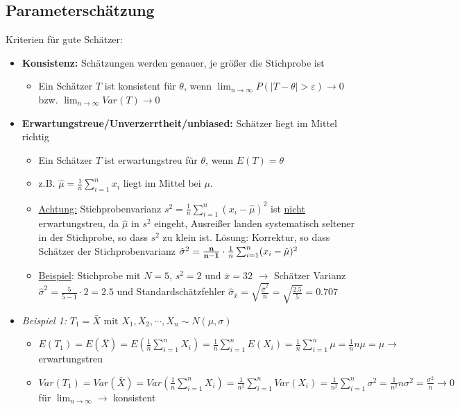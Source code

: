 \subsection{Parameterschätzung}

Kriterien für gute Schätzer:
\begin{itemize}
    \item \textbf{Konsistenz:} Schätzungen werden genauer, je größer die Stichprobe ist
    \begin{itemize}
        \item Ein Schätzer \(T\) ist konsistent für \(\theta\), wenn \(\lim_{n\rightarrow\infty}P(|T-\theta|>\varepsilon)\rightarrow 0\) bzw. \(\lim_{n\rightarrow\infty}Var(T)\rightarrow 0\)
    \end{itemize}
    \item \textbf{Erwartungstreue/Unverzerrtheit/unbiased:} Schätzer liegt im Mittel richtig
    \begin{itemize}
        \item Ein Schätzer \(T\) ist erwartungstreu für \(\theta\), wenn \(E(T)=\theta\)
        \item z.B. \(\hat{\mu}=\frac{1}{n}\sum_{i=1}^{n}x_i\) liegt im Mittel bei \(\mu\). 
        \item \underline{Achtung:} Stichprobenvarianz \(s^2=\frac{1}{n}\sum_{i=1}^{n}(x_i-\hat{\mu})^2\) ist \underline{nicht} erwartungstreu, da \(\hat{\mu}\) in \(s^2\) eingeht, Ausreißer landen systematisch seltener in der Stichprobe, so dass \(s^2\) zu klein ist. Lösung: Korrektur, so dass Schätzer der Stichprobenvarianz \(\hat{\sigma}^2=\bold{\frac{n}{n-1}}\cdot\frac{1}{n}\sum_{i=1}^{n}(x_i-\hat{\mu})^2\)
        \item \underline{Beispiel}: Stichprobe mit \(N=5\text{, }s^2=2 \text{ und } \bar{x}=32\) \(\rightarrow\) Schätzer Varianz \(\hat{\sigma}^2=\frac{5}{5-1}\cdot 2=2.5\) und Standardschätzfehler \(\hat{\sigma}_{\bar{x}}=\sqrt{\frac{\hat{\sigma}^2}{n}}=\sqrt{\frac{2.5}{5}}=0.707\)
    \end{itemize}
    \item \emph{Beispiel 1:} \(T_1=\bar{X}\text{ mit }X_1, X_2, \cdots, X_n\sim N(\mu, \sigma)\)
    \begin{itemize}
        \item \(E(T_1)=E(\bar{X})=E(\frac{1}{n}\sum_{i=1}^{n}X_i)=\frac{1}{n}\sum_{i=1}^{n}E(X_i)=\frac{1}{n}\sum_{i=1}^{n}\mu=\frac{1}{n}n\mu=\mu \rightarrow\) erwartungstreu
        \item \(Var(T_1)=Var(\bar{X})=Var(\frac{1}{n}\sum_{i=1}^{n}X_i)=\frac{1}{n^2}\sum_{i=1}^{n}Var(X_i)=\frac{1}{n^2}\sum_{i=1}^{n}\sigma^2=\frac{1}{n^2}n\sigma^2=\frac{\sigma^2}{n} \rightarrow 0\) für \(\lim_{n\rightarrow\infty}\rightarrow\) konsistent

\end{itemize}
\end{itemize}
